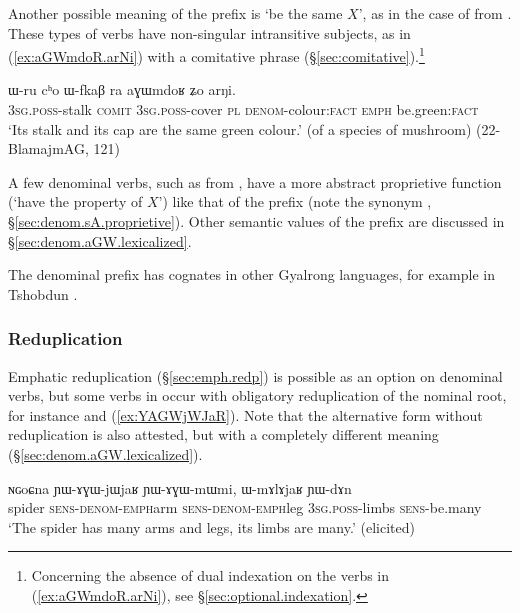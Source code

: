 Another possible meaning of the  prefix is `be the same $X$', as in the case of  from . These types of verbs have non-singular intransitive subjects, as in (\ref{ex:aGWmdoR.arNi}) with a comitative phrase (§\ref{sec:comitative}).\footnote{Concerning the absence of dual indexation on the verbs in (\ref{ex:aGWmdoR.arNi}), see §\ref{sec:optional.indexation}. }

\begin{exe}
\ex \label{ex:aGWmdoR.arNi}
\gll ɯ-ru cʰo ɯ-fkaβ ra aɣɯmdoʁ ʑo arŋi. \\
\textsc{3sg}.\textsc{poss}-stalk \textsc{comit} \textsc{3sg}.\textsc{poss}-cover \textsc{pl} \textsc{denom}-colour:\textsc{fact} \textsc{emph} be.green:\textsc{fact} \\
\glt `Its stalk and its cap are the same green colour.' (of a species of mushroom) (22-BlamajmAG, 121)
 \end{exe}

A few  denominal verbs, such as 	from , have a more abstract proprietive function (`have the property of $X$') like that of the  prefix (note the synonym , §\ref{sec:denom.sA.proprietive}). Other semantic values of the  prefix are  discussed in §\ref{sec:denom.aGW.lexicalized}.

The  denominal prefix has cognates in other Gyalrong languages, for example  in Tshobdun \citep{jackson14morpho}.

\subsubsection{Reduplication} \label{sec:denom.aGW.redp}
Emphatic reduplication (§\ref{sec:emph.redp}) is  possible as an option on denominal verbs, but some verbs in  occur with obligatory reduplication of the nominal root, for instance  and  (\ref{ex:YAGWjWJaR}). Note that the alternative form  without reduplication is also attested, but with a completely different meaning (§\ref{sec:denom.aGW.lexicalized}).

\begin{exe}
\ex \label{ex:YAGWjWJaR}
\gll ɴɢoɕna ɲɯ-ɤɣɯ-jɯ\redp{}jaʁ ɲɯ-ɤɣɯ-mɯ\redp{}mi, ɯ-mɤlɤjaʁ ɲɯ-dɤn \\
spider \textsc{sens}-\textsc{denom}-\textsc{emph}\redp{}arm  \textsc{sens}-\textsc{denom}-\textsc{emph}\redp{}leg \textsc{3sg}.\textsc{poss}-limbs \textsc{sens}-be.many \\
\glt  `The spider has many arms and legs, its limbs are many.' (elicited)
 \end{exe}

